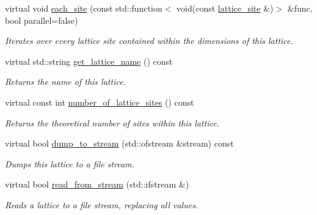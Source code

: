\begin{DoxyCompactItemize}
virtual void \hyperlink{classsisl_1_1cartesian__cubic_a6e462e0f77044a855df84a3323660bff}{each\+\_\+site} (const std\+::function$<$ void(const \hyperlink{namespacesisl_acd18feee4026583db6185df2b25434aa}{lattice\+\_\+site} \&)$>$ \&func, bool parallel=false)
\begin{DoxyCompactList}\small\item\em Iterates over every lattice site contained within the dimensions of this lattice. \end{DoxyCompactList}\item 
\mbox{\label{classsisl_1_1cartesian__cubic_a9b076e76c2bffc4a0ed38d5fa7e65fad}} 
virtual std\+::string \hyperlink{classsisl_1_1cartesian__cubic_a9b076e76c2bffc4a0ed38d5fa7e65fad}{get\+\_\+lattice\+\_\+name} () const
\begin{DoxyCompactList}\small\item\em Returns the name of this lattice. \end{DoxyCompactList}\item 
\mbox{\label{classsisl_1_1cartesian__cubic_a1f6efaeaabe591bde7f9afa83a1f0699}} 
virtual const int \hyperlink{classsisl_1_1cartesian__cubic_a1f6efaeaabe591bde7f9afa83a1f0699}{number\+\_\+of\+\_\+lattice\+\_\+sites} () const
\begin{DoxyCompactList}\small\item\em Returns the theoretical number of sites within this lattice. \end{DoxyCompactList}\item 
\mbox{\label{classsisl_1_1cartesian__cubic_a00b578d2ad943a7181b591b5537a358d}} 
virtual bool \hyperlink{classsisl_1_1cartesian__cubic_a00b578d2ad943a7181b591b5537a358d}{dump\+\_\+to\+\_\+stream} (std\+::ofstream \&stream) const
\begin{DoxyCompactList}\small\item\em Dumps this lattice to a file stream. \end{DoxyCompactList}\item 
\mbox{\label{classsisl_1_1cartesian__cubic_ab3c5e58ee1b42f18d6bb86925088797d}} 
virtual bool \hyperlink{classsisl_1_1cartesian__cubic_ab3c5e58ee1b42f18d6bb86925088797d}{read\+\_\+from\+\_\+stream} (std\+::ifstream \&)
\begin{DoxyCompactList}\small\item\em Reads a lattice to a file stream, replacing all values. \end{DoxyCompactList}\item 

\end{DoxyCompactItemize}
